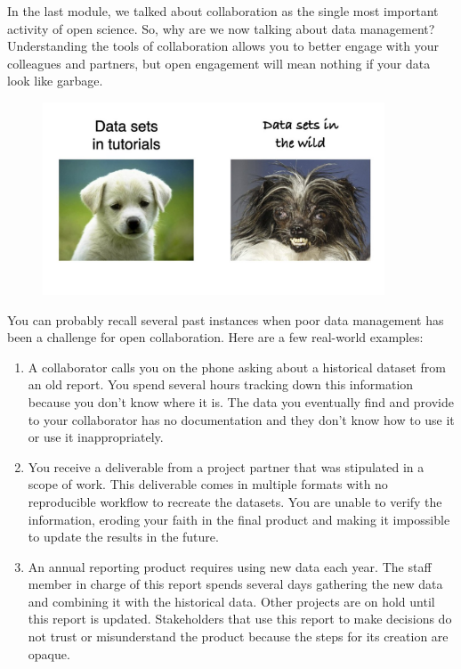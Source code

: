 \documentclass[
  letterpaper,
  DIV=11,
  numbers=noendperiod]{scrreprt}
\providecommand{\tightlist}{%
  \setlength{\itemsep}{0pt}\setlength{\parskip}{0pt}}\usepackage{longtable,booktabs,array}
\begin{document}
In the last module, we talked about collaboration as the single most
important activity of open science. So, why are we now talking about
data management? Understanding the tools of collaboration allows you to
better engage with your colleagues and partners, but open engagement
will mean nothing if your data look like garbage.

\begin{figure}

{\centering \includegraphics[width=4in,height=\textheight]{./img/datameme.jpg}

}

\end{figure}

You can probably recall several past instances when poor data management
has been a challenge for open collaboration. Here are a few real-world
examples:

\begin{enumerate}
\def\labelenumi{\arabic{enumi}.}
\tightlist
\item
  A collaborator calls you on the phone asking about a historical
  dataset from an old report. You spend several hours tracking down this
  information because you don't know where it is. The data you
  eventually find and provide to your collaborator has no documentation
  and they don't know how to use it or use it inappropriately.
\item
  You receive a deliverable from a project partner that was stipulated
  in a scope of work. This deliverable comes in multiple formats with no
  reproducible workflow to recreate the datasets. You are unable to
  verify the information, eroding your faith in the final product and
  making it impossible to update the results in the future.
\item
  An annual reporting product requires using new data each year. The
  staff member in charge of this report spends several days gathering
  the new data and combining it with the historical data. Other projects
  are on hold until this report is updated. Stakeholders that use this
  report to make decisions do not trust or misunderstand the product
  because the steps for its creation are opaque.
\end{enumerate}
\end{document}
